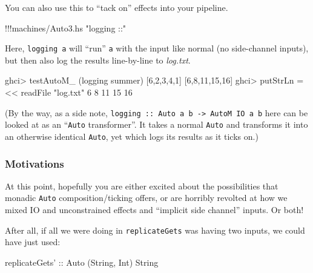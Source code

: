 \documentclass[]{article}
\newenvironment{Shaded}{}{}
\newcommand{\DataTypeTok}[1]{\textcolor[rgb]{0.56,0.13,0.00}{{#1}}}
\newcommand{\DecValTok}[1]{\textcolor[rgb]{0.25,0.63,0.44}{{#1}}}
\newcommand{\StringTok}[1]{\textcolor[rgb]{0.25,0.44,0.63}{{#1}}}
\newcommand{\OtherTok}[1]{\textcolor[rgb]{0.00,0.44,0.13}{{#1}}}
\newcommand{\FunctionTok}[1]{\textcolor[rgb]{0.02,0.16,0.49}{{#1}}}
\newcommand{\NormalTok}[1]{{#1}}
\begin{document}
You can also use this to ``tack on'' effects into your pipeline.

\begin{Shaded}
\begin{Highlighting}[]
\FunctionTok{!!!}\NormalTok{machines}\FunctionTok{/}\NormalTok{Auto3.hs }\StringTok{"logging ::"}
\end{Highlighting}
\end{Shaded}

Here, \texttt{logging\ a} will ``run'' \texttt{a} with the input like
normal (no side-channel inputs), but then also log the results
line-by-line to \emph{log.txt}.

\begin{Shaded}
\begin{Highlighting}[]
\NormalTok{ghci}\FunctionTok{>} \NormalTok{testAutoM_ (logging summer) [}\DecValTok{6}\NormalTok{,}\DecValTok{2}\NormalTok{,}\DecValTok{3}\NormalTok{,}\DecValTok{4}\NormalTok{,}\DecValTok{1}\NormalTok{]}
\NormalTok{[}\DecValTok{6}\NormalTok{,}\DecValTok{8}\NormalTok{,}\DecValTok{11}\NormalTok{,}\DecValTok{15}\NormalTok{,}\DecValTok{16}\NormalTok{]}
\NormalTok{ghci}\FunctionTok{>} \NormalTok{putStrLn }\FunctionTok{=<<} \NormalTok{readFile }\StringTok{"log.txt"}
\DecValTok{6}
\DecValTok{8}
\DecValTok{11}
\DecValTok{15}
\DecValTok{16}
\end{Highlighting}
\end{Shaded}

(By the way, as a side note,
\texttt{logging\ ::\ Auto\ a\ b\ -\textgreater{}\ AutoM\ IO\ a\ b} here
can be looked at as an ``\texttt{Auto} transformer''. It takes a normal
\texttt{Auto} and transforms it into an otherwise identical
\texttt{Auto}, yet which logs its results as it ticks on.)

\subsubsection{Motivations}\label{motivations}

At this point, hopefully you are either excited about the possibilities
that monadic \texttt{Auto} composition/ticking offers, or are horribly
revolted at how we mixed IO and unconstrained effects and ``implicit
side channel'' inputs. Or both!

After all, if all we were doing in \texttt{replicateGets} was having two
inputs, we could have just used:

\begin{Shaded}
\begin{Highlighting}[]
\OtherTok{replicateGets' ::} \DataTypeTok{Auto} \NormalTok{(}\DataTypeTok{String}\NormalTok{, }\DataTypeTok{Int}\NormalTok{) }\DataTypeTok{String}
\end{Highlighting}
\end{Shaded}
\end{document}

